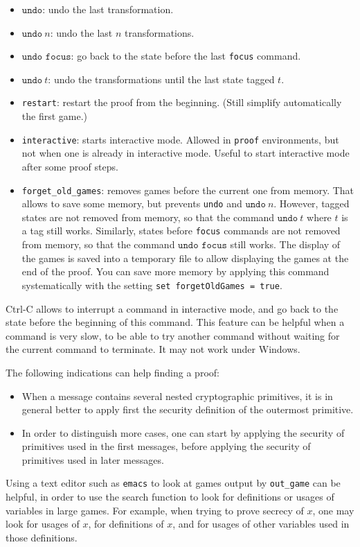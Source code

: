 \documentclass{article}
\begin{document}
\begin{itemize}
\item $\texttt{undo}$: undo the last transformation.

\item $\texttt{undo}\ n$: undo the last $n$ transformations.

\item $\texttt{undo\ focus}$: go back to the state before the last \texttt{focus} command.
  
\item $\texttt{undo}\ t$: undo the transformations until the last state tagged $t$.

\item \texttt{restart}: restart the proof from the beginning.
(Still simplify automatically the first game.)

\item \texttt{interactive}: starts interactive mode.
Allowed in \texttt{proof} environments, but not when one is
already in interactive mode. Useful to start interactive mode
after some proof steps.

\item \texttt{forget\_old\_games}: removes games before the current one
from memory. That allows to save some memory, but prevents \texttt{undo}
and $\texttt{undo}\ n$.
However, tagged states are not removed from memory, so that the command
$\texttt{undo}\ t$ where $t$ is a tag still works.
Similarly, states before \texttt{focus} commands are not removed from 
memory, so that the command $\texttt{undo\ focus}$ still works.
The display of the games is saved into a temporary file to allow
displaying the games at the end of the proof.
You can save more memory by applying this command systematically with
the setting \texttt{set forgetOldGames = true}.

\end{itemize}
Ctrl-C allows to interrupt a command in interactive mode,
and go back to the state before the beginning of this command.
This feature can be helpful when a command is very slow,
to be able to try another command without waiting for the current command 
to terminate. It may not work under Windows.

The following indications can help finding a proof:
\begin{itemize}

\item When a message contains several nested cryptographic primitives,
it is in general better to apply first the security definition of the
outermost primitive.

\item In order to distinguish more cases, one can start by applying
the security of primitives used in the first messages, before applying
the security of primitives used in later messages.

\end{itemize}
Using a text editor such as \texttt{emacs} to look at games output
by \texttt{out\_game} can be
helpful, in order to use the search function to look for definitions
or usages of variables in large games.  For example, when trying to
prove secrecy of $x$, one may look for usages of $x$, for
definitions of $x$, and for usages of other variables used in those
definitions.
\end{document}
